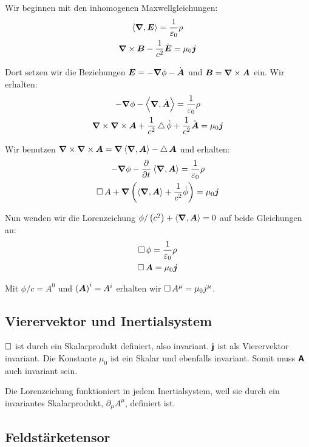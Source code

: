Wir beginnen mit den inhomogenen Maxwellgleichungen:
\begin{gather*}
	\left\langle \boldsymbol{\nabla}, \boldsymbol{E} \right\rangle = \frac{1}{\varepsilon_0} \rho \\
	\boldsymbol{\nabla} \times \boldsymbol{B} - \frac{1}{c^2} \dot{\boldsymbol{E}} = \mu_0 \boldsymbol{j}
\end{gather*}

Dort setzen wir die Beziehungen $\boldsymbol{E} = - \boldsymbol{\nabla} \phi - \dot{\boldsymbol{A}}$ und
$\boldsymbol{B} = \boldsymbol{\nabla} \times \boldsymbol{A}$ ein. Wir erhalten:
\begin{gather*}
	- \boldsymbol{\nabla} \phi - \left\langle \boldsymbol{\nabla}, \dot{\boldsymbol{A}} \right\rangle = \frac{1}{\varepsilon_0} \rho \\
	\boldsymbol{\nabla} \times \boldsymbol{\nabla} \times \boldsymbol{A} + \frac 1{c^2} \operatorname{\bigtriangleup} \dot \phi + \frac 1{c^2} \ddot{\boldsymbol{A}} = \mu_0 \boldsymbol{j}
\end{gather*}

Wir benutzen $\boldsymbol{\nabla} \times \boldsymbol{\nabla} \times \boldsymbol{A} = \boldsymbol{\nabla} \left\langle \boldsymbol{\nabla}, \boldsymbol{A} \right\rangle - \operatorname{\bigtriangleup} \boldsymbol{A}$ und erhalten:
\begin{gather*}
	- \vnabla \phi - \dpd{}t \divergence{\vec A} = \frac{1}{\varepsilon_0} \rho \\
	\dalambert A + \vnabla\del{\divergence{\vec A} + \frac 1{c^2} \dot \phi} = \mu_0 \vec j
\end{gather*}

Nun wenden wir die Lorenzeichung $\phi/\del{c^2} + \divergence{\vec A} = 0$ auf
beide Gleichungen an:
\begin{gather*}
	\operatorname{\Box} \phi = \frac{1}{\varepsilon_0} \rho \\
	\operatorname{\Box} \boldsymbol{A} = \mu_0 \boldsymbol{j}
\end{gather*}

Mit $\phi/c = A^0$ und $\del{\vec A}^i = A^i$ erhalten wir $\operatorname{\Box} A^\mu =
\mu_0 j^\mu$.

\subsection{Vierervektor und Inertialsystem}

$\operatorname{\Box}$ ist durch ein Skalarprodukt definiert, also invariant. $\boldsymbol{\mathsf{j}}$
ist als Vierervektor invariant. Die Konstante $\mu_0$ ist ein Skalar und
ebenfalls invariant. Somit muss $\boldsymbol{\mathsf{A}}$ auch invariant sein.

Die Lorenzeichung funktioniert in jedem Inertialsystem, weil sie durch ein
invariantes Skalarprodukt, $\partial_\mu A^\mu$, definiert ist.

\subsection{Feldstärketensor}

